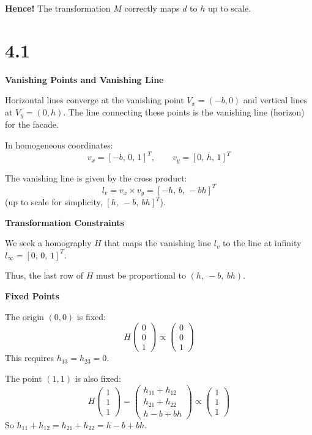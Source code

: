 \documentclass[12pt]{article}
\begin{document}
    \textbf{Hence!} The transformation $M$ correctly maps $d$ to $h$ up to scale.

    \section*{4.1}
    \textbf{Vanishing Points and Vanishing Line}

    Horizontal lines converge at the vanishing point $V_x = (-b, 0)$ and vertical lines at $V_y = (0, h)$. The line connecting these points is the vanishing line (horizon) for the facade.

    In homogeneous coordinates:
    \[
    v_x = [-b,\, 0,\, 1]^T,\qquad v_y = [0,\, h,\, 1]^T
    \]

    The vanishing line is given by the cross product:
    \[
    l_v = v_x \times v_y = [-h,\, b,\, -bh]^T
    \]
    (up to scale for simplicity, $[h,\ -b,\ bh]^T$).

    

    \textbf{Transformation Constraints}

    We seek a homography $H$ that maps the vanishing line $l_v$ to the line at infinity $l_\infty = [0,\, 0,\, 1]^T$.

    Thus, the last row of $H$ must be proportional to $(h,\ -b,\ bh)$.

    \textbf{Fixed Points}

    The origin $(0, 0)$ is fixed:
    \[
    H \begin{pmatrix} 0 \\ 0 \\ 1 \end{pmatrix} \propto \begin{pmatrix} 0 \\ 0 \\ 1 \end{pmatrix}
    \]
    This requires $h_{13} = h_{23} = 0$.

    The point $(1, 1)$ is also fixed:
    \[
    H \begin{pmatrix} 1 \\ 1 \\ 1 \end{pmatrix} = \begin{pmatrix} h_{11} + h_{12} \\ h_{21} + h_{22} \\ h - b + bh \end{pmatrix} \propto \begin{pmatrix} 1 \\ 1 \\ 1 \end{pmatrix}
    \]
    So $h_{11} + h_{12} = h_{21} + h_{22} = h - b + bh$.
\end{document}
